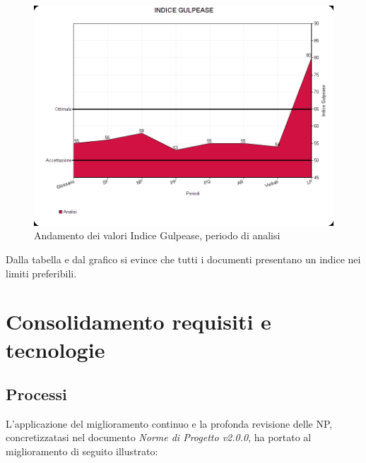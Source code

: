 \documentclass[openany,12pt,a4paper]{report}
\begin{document}
\begin{itemize}
	\begin{figure}[H]
		\includegraphics[scale=0.5]{Gulpease/gulpease-analisi}
		\centering
		\caption{Andamento dei valori Indice Gulpease, periodo di analisi}
	\end{figure}
		
	Dalla tabella e dal grafico si evince che tutti i documenti presentano un indice nei limiti preferibili.

\end{itemize}


\section{Consolidamento requisiti e tecnologie}

\subsection{Processi}

L'applicazione del miglioramento continuo e la profonda revisione delle NP, concretizzatasi nel documento \textit{Norme di Progetto v2.0.0}, ha portato al miglioramento di seguito illustrato:

\newpage
\end{document}
